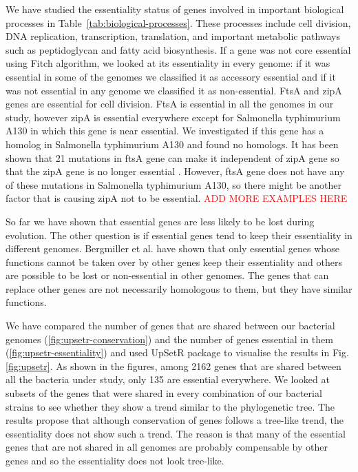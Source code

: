 \documentclass[12pt,letterpaper]{article}
\begin{document}
We have studied the essentiality status of genes involved in important biological processes in Table~\ref{tab:biological-processes}. These processes include cell division, DNA replication, transcription, translation, and important metabolic pathways such as peptidoglycan and fatty acid biosynthesis. If a gene was not core essential using Fitch algorithm, we looked at its essentiality in every genome: if it was essential in some of the genomes we classified it as accessory essential and if it was not essential in any genome we classified it as non-essential. FtsA and zipA genes are essential for cell division. FtsA is essential in all the genomes in our study, however zipA is essential everywhere except for Salmonella typhimurium A130 in which this gene is near essential. We investigated if this gene has a homolog in Salmonella typhimurium A130 and found no homologs. It has been shown that 21 mutations in ftsA gene can make it independent of zipA gene so that the zipA gene is no longer essential \cite{geissler_gain--function_2003, pichoff_ftsa_2012}. However, ftsA gene does not have any of these mutations in Salmonella typhimurium A130, so there might be another factor that is causing zipA not to be essential. \textcolor{red}{ADD MORE EXAMPLES HERE}

So far we have shown that essential genes are less likely to be lost during evolution. The other question is if essential genes tend to keep their essentiality in different genomes. Bergmiller et al. \cite{bergmiller_patterns_2012} have shown that only essential genes whose functions cannot be taken over by other genes keep their essentiality and others are possible to be lost or non-essential in other genomes. The genes that can replace other genes are not necessarily homologous to them, but they have similar functions.

We have compared the number of genes that are shared between our bacterial genomes (\ref{fig:upsetr-conservation}) and the number of genes essential in them (\ref{fig:upsetr-essentiality}) and used UpSetR package \cite{conway_upsetr:_2016} to visualise the results in Fig.\@ \ref{fig:upsetr}. As shown in the figures, among 2162 genes that are shared between all the bacteria under study, only 135 are essential everywhere. We looked at subsets of the genes that were shared in every combination of our bacterial strains to see whether they show a trend similar to the phylogenetic tree. The results propose that although conservation of genes follows a tree-like trend, the essentiality does not show such a trend. The reason is that many of the essential genes that are not shared in all genomes are probably compensable by other genes and so the essentiality does not look tree-like.
\end{document}

